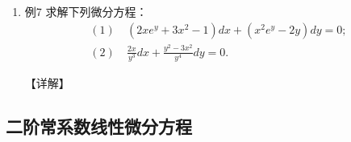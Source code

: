 \documentclass[12pt, a4paper, oneside, UTF8]{ctexbook}
\begin{document}
\begin{remark}
\end{remark}

\begin{enumerate}[label=\arabic*.,start=7]
    \item 例7 求解下列微分方程：
    \begin{align*}
        (1)\ &(2xe^y+3x^2-1)dx+(x^2e^y-2y)dy=0; \\
        (2)\ &\frac{2x}{y^3}dx+\frac{y^2-3x^2}{y^4}dy=0.
    \end{align*}
    
    \begin{solution}
    【详解】
    \end{solution}
\end{enumerate}

\subsection{二阶常系数线性微分方程}
\end{document}

